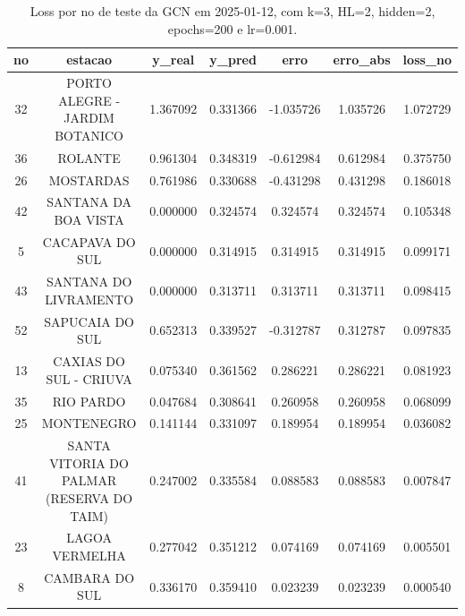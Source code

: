 \begin{table}[h]
\centering
\caption{Loss por no de teste da GCN em 2025-01-12, com k=3, HL=2, hidden=2, epochs=200 e lr=0.001.}
\label{tab:gcn_loss_k3_hl2_h2_e200_d20250112}
\begin{tabular}{ccccccc}
\toprule
no & estacao & y\_real & y\_pred & erro & erro\_abs & loss\_no \\
\midrule
32 & PORTO ALEGRE - JARDIM BOTANICO & 1.367092 & 0.331366 & -1.035726 & 1.035726 & 1.072729 \\
36 & ROLANTE & 0.961304 & 0.348319 & -0.612984 & 0.612984 & 0.375750 \\
26 & MOSTARDAS & 0.761986 & 0.330688 & -0.431298 & 0.431298 & 0.186018 \\
42 & SANTANA DA BOA VISTA & 0.000000 & 0.324574 & 0.324574 & 0.324574 & 0.105348 \\
5 & CACAPAVA DO SUL & 0.000000 & 0.314915 & 0.314915 & 0.314915 & 0.099171 \\
43 & SANTANA DO LIVRAMENTO & 0.000000 & 0.313711 & 0.313711 & 0.313711 & 0.098415 \\
52 & SAPUCAIA DO SUL & 0.652313 & 0.339527 & -0.312787 & 0.312787 & 0.097835 \\
13 & CAXIAS DO SUL - CRIUVA & 0.075340 & 0.361562 & 0.286221 & 0.286221 & 0.081923 \\
35 & RIO PARDO & 0.047684 & 0.308641 & 0.260958 & 0.260958 & 0.068099 \\
25 & MONTENEGRO & 0.141144 & 0.331097 & 0.189954 & 0.189954 & 0.036082 \\
41 & SANTA VITORIA DO PALMAR (RESERVA DO TAIM) & 0.247002 & 0.335584 & 0.088583 & 0.088583 & 0.007847 \\
23 & LAGOA VERMELHA & 0.277042 & 0.351212 & 0.074169 & 0.074169 & 0.005501 \\
8 & CAMBARA DO SUL & 0.336170 & 0.359410 & 0.023239 & 0.023239 & 0.000540 \\
\bottomrule
\end{tabular}
\end{table}
